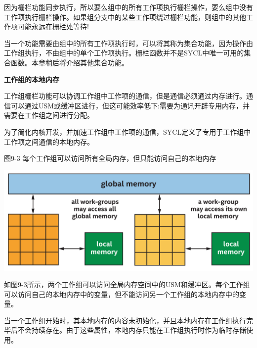 因为栅栏功能同步执行，所以要么组中的所有工作项执行栅栏操作，要么组中没有工作项执行栅栏操作。如果组分支中的某些工作项绕过栅栏功能，则组中的其他工作项可能永远在栅栏处等待!\par

\begin{tcolorbox}[colback=blue!5!white,colframe=blue!75!black, title=集合功能]
当一个功能需要由组中的所有工作项执行时，可以将其称为集合功能，因为操作由工作组执行，不由组中的单个工作项执行。栅栏函数并不是SYCL中唯一可用的集合函数。本章稍后将介绍其他集合功能。
\end{tcolorbox}

\hspace*{\fill} \par %
\textbf{工作组的本地内存}

工作组栅栏功能可以协调工作组中工作项的通信，但是通信必须通过内存进行。通信可以通过USM或缓冲区进行，但这可能效率低下:需要为通讯开辟专用内存，并需要在工作组之间进行分配。\par

为了简化内核开发，并加速工作组中工作项的通信，SYCL定义了专用于工作组中工作项之间通信的本地内存。\par

\hspace*{\fill} \par %
图9-3 每个工作组可以访问所有全局内存，但只能访问自己的本地内存
\begin{center}
	\includegraphics[width=1.\textwidth]{content/chapter-9/images/4}
\end{center}

如图9-3所示，两个工作组可以访问全局内存空间中的USM和缓冲区。每个工作组可以访问自己的本地内存中的变量，但不能访问另一个工作组的本地内存中的变量。\par

当一个工作组开始时，其本地内存的内容未初始化，并且本地内存在工作组执行完毕后不会持续存在。由于这些属性，本地内存只能在工作组执行时作为临时存储使用。\par

